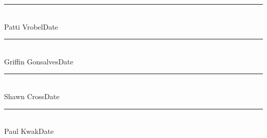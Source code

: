 \documentclass[letterpaper, 10pt, draftclsnofoot, compsoc, onecolumn]{IEEEtran}
\begin{document}
\newpage
\null
\vfill
\begin{flushleft}


	\begin{Form}
		\rule{5in}{.4mm}\\
			Patti Vrobel\hspace{60ex}Date
	\end{Form}
		
	\vspace{1cm}	
	
	\rule{5in}{.4mm}\\
	Griffin Gonsalves\hspace{55ex}Date
		
	\vspace{1cm}	
	
	\rule{5in}{.4mm}\\
	Shawn Cross\hspace{59ex}Date
	
	\vspace{1cm}	
	
	\rule{5in}{.4mm}\\
	Paul Kwak\hspace{61ex}Date

\end{flushleft}
\end{document}
